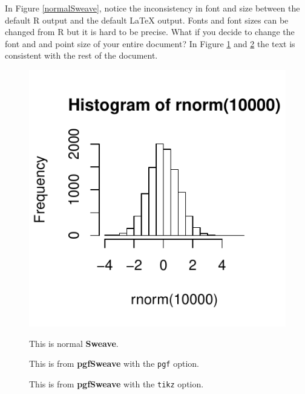 \documentclass{article}
\newcommand{\lang}{\textsf}
\newcommand{\code}{\texttt}
\newcommand{\pkg}{\textbf}
\begin{document}
 In Figure \ref{normalSweave}, notice the inconsistency in font and size between the default \lang{R} output and the default \LaTeX{} output.  Fonts and font sizes can be changed from \lang{R} but it is hard to be precise.  What if you decide to change the font and and point size of your entire document?  In Figure \ref{pgfSweave-hist} and \ref{pgfSweave-tikz-hist} the text is consistent with the rest of the document.

\begin{figure}[!ht]
\begin{minipage}{.45\linewidth}
\centering

\includegraphics{figs/fig-normalSweave}
\caption{This is normal \pkg{Sweave}.}\label{normalSweave}
\end{minipage}
\begin{minipage}[!ht]{.45\linewidth}
\centering



\endpgfgraphicnamed
\caption{This is from \pkg{pgfSweave} with the \code{pgf} option.}\label{pgfSweave-hist}
\end{minipage}
\end{figure}

\begin{figure}[!ht]
\centering



\endpgfgraphicnamed
\caption{This is from \pkg{pgfSweave} with the \code{tikz} option.}\label{pgfSweave-tikz-hist}
\end{figure}
\end{document}
